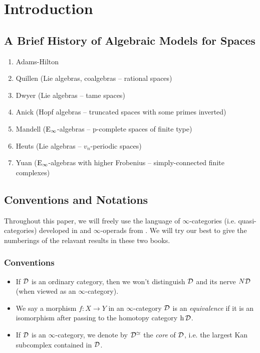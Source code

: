 \chapter{Introduction}

\section{A Brief History of Algebraic Models for Spaces}
\begin{enumerate}
	\item Adams-Hilton
	\item Quillen (Lie algebras, coalgebras -- rational spaces)
	\item Dwyer (Lie algebras -- tame spaces)
	\item Anick (Hopf algebras -- truncated spaces with some primes inverted)
	\item Mandell ($\operatorname{E}_{\infty}$-algebras -- p-complete spaces of finite type)
	\item Heuts (Lie algebras -- $v_n$-periodic spaces)
	\item Yuan ($\operatorname{E}_{\infty}$-algebras with higher Frobenius -- simply-connected finite complexes)
\end{enumerate}


\section{Conventions and Notations}
Throughout this paper, we will freely use the language of $\infty$-categories (i.e. quasi-categories) developed in \cite{HTT} and $\infty$-operads from \cite{HA}.
We will try our best to give the numberings of the relavant results in these two books.

\subsection{Conventions}
\begin{itemize}
	\item If ${\mathcal{D}}$ is an ordinary category, then we won't distinguish ${\mathcal{D}}$ and its nerve $N{\mathcal{D}}$ (when viewed as an $\infty$-category).
	\item We say a morphism $f:X\rightarrow Y$ in an $\infty$-category ${\mathcal{D}}$ is an \emph{equivalence} if it is an isomorphism after passing to the homotopy category $\operatorname{h}{\mathcal{D}}$.
    \item If ${\mathcal{D}}$ is an $\infty$-category, we denote by ${\mathcal{D}}^{\simeq}$ the \emph{core} of ${\mathcal{D}}$, i.e. the largest Kan subcomplex contained in ${\mathcal{D}}$.  
\end{itemize}

